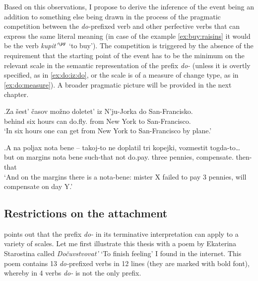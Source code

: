 Based on this observations, I propose to derive the inference of the event being an addition to something else being drawn in the process of the pragmatic competition between the \textit{do-}prefixed verb and other perfective verbs that can express the same literal meaning (in case of the example \ref{ex:buy:raisins} it would be the verb \textit{kupit'$^{\PF}$} `to buy'). The competition is triggered by the absence of the requirement that the starting point of the event has to be the minimum on the relevant scale in the semantic representation of the prefix \textit{do-} (unless it is overtly specified, as in \ref{ex:do:iz:do}, or the scale is of a measure of change type, as in \ref{ex:do:measure}). A broader pragmatic picture will be provided in the next chapter.

\exg.\label{ex:do:iz:do}Za \v{s}est' \v{c}asov mo\v{z}no doletet' iz N'ju-Jorka do San-Francisko.\\
behind six hours can do.fly. from {New York} to San-Francisco.\\
\trans `In six hours one can get from New York to San-Francisco by plane.'\\

\exg.\label{ex:do:measure}A na poljax nota bene -- takoj-to ne doplatil tri kopejki, vozmestit togda-to…\\
but on margins nota bene {} such-that not do.pay. three pennies, compensate. then-that\\
\trans `And on the margins there is a nota-bene: mister X failed to pay 3 pennies, will compensate on day Y.'

\subsection{Restrictions on the attachment}
\citet[236]{Kagan:12} points out that the prefix \textit{do-} in its terminative interpretation can apply to a variety of scales. Let me first illustrate this thesis with a poem by Ekaterina Starostina called \textit{Do\v{c}uvstvovat'} `To finish feeling' I found in the internet. This poem contains 13 \textit{do-}prefixed verbs in 12 lines (they are marked with bold font), whereby in 4 verbs \textit{do-} is not the only prefix.

